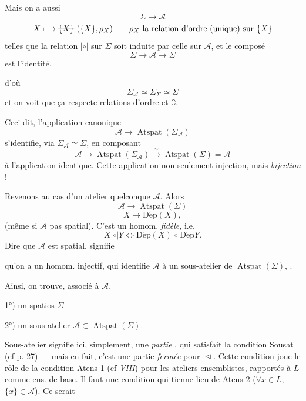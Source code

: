 \documentclass[11pt,a4paper]{article}
\begin{document}
Mais on a aussi
\[
  \Sigma \longrightarrow \mathcal{A}
\]
\[
  X \longmapsto \text{\struck{$\{X\}$}}\ (\{X\}, \rho_{X}) \qquad
  \rho_{X} \ \text{la relation d'ordre (unique) sur } \{X\}
\]
telles que la relation $\mathrel{|\circ|}$ sur $\Sigma$ soit induite par celle
sur $\mathcal{A}$, et le composé
\[
  \Sigma \longrightarrow \mathcal{A} \longrightarrow \Sigma
\]
est l'identité.


d'où
\[
  \Sigma_{\mathcal{A}} \simeq \Sigma_{\Sigma} \simeq \Sigma
\]
et on voit que ça respecte relations d'ordre et
$\complement$.

Ceci dit, l'application canonique
\[
  \mathcal{A} \longrightarrow \operatorname{Atspat}(\Sigma_{\mathcal{A}})
\]
s'identifie, via $\Sigma_{\mathcal{A}} \simeq \Sigma$, en composant
\[
  \mathcal{A} \longrightarrow \operatorname{Atspat}(\Sigma_{\mathcal{A}})
  \xrightarrow{\ \sim\ } \operatorname{Atspat}(\Sigma) = \mathcal{A}
\]
à l'application identique. Cette application  non seulement injection, mais \emph{bijection} !

Revenons au cas d'un atelier  quelconque $\mathcal{A}$.
 Alors  
\[
  \mathcal{A} \longrightarrow \operatorname{Atspat}(\Sigma)
\]
\[
  X \longmapsto \operatorname{D\acute{e}p}(X) ,
\]
(même si  $\mathcal{A}$  pas spatial). C'est un homom. \emph{fidèle}, i.e.
\[
  X \mathrel{|\circ|} Y \iff
  \operatorname{D\acute{e}p}(X) \mathrel{|\circ|} \operatorname{D\acute{e}p} Y .
\]
Dire que $\mathcal{A}$ est spatial, signifie


qu'on a un homom. injectif, qui identifie 
$\mathcal{A}$ à un sous-atelier de $\operatorname{Atspat}(\Sigma)$,
.

Ainsi, on trouve, associé à $\mathcal{A}$,

1°) un spatios $\Sigma$

2°) un sous-atelier $\mathcal{A} \subset \operatorname{Atspat}(\Sigma)$.

Sous-atelier signifie ici, simplement, une \emph{partie} , qui
satisfait la condition Sousat (cf p. 27) --- mais en fait, c'est 
une partie \emph{fermée} pour $\trianglelefteq$. Cette condition joue le rôle
de la  condition Atens 1 (cf 
\emph{VIII}) pour les ateliers ensemblistes, rapportés à $L$  comme ens. de base. Il faut une condition qui \struck{\ill{}}
tienne lieu de Atens 2 ($\forall x \in L$, $\{x\} \in \mathcal{A}$). Ce
serait
\end{document}
